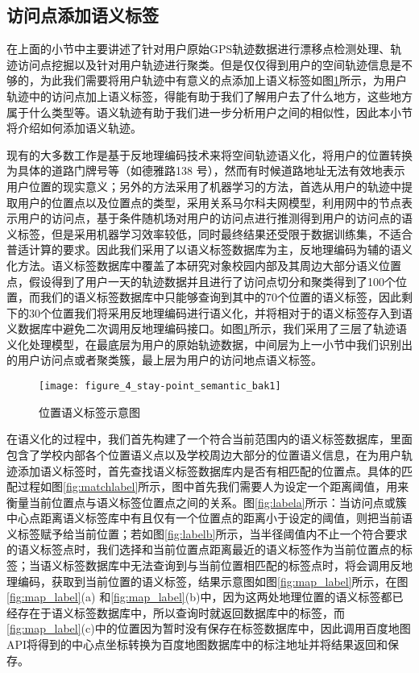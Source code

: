 \subsection{访问点添加语义标签}
\label{sec:section3-3}
\par 在上面的小节中主要讲述了针对用户原始GPS轨迹数据进行漂移点检测处理、轨迹访问点挖掘以及针对用户轨迹进行聚类。但是仅仅得到用户的空间轨迹信息是不够的，为此我们需要将用户轨迹中有意义的点添加上语义标签如图\ref{fig:tra_senantic}所示，为用户轨迹中的访问点加上语义标签，得能有助于我们了解用户去了什么地方，这些地方属于什么类型等。语义轨迹有助于我们进一步分析用户之间的相似性，因此本小节将介绍如何添加语义轨迹。
\par 现有的大多数工作是基于反地理编码技术来将空间轨迹语义化，将用户的位置转换为具体的道路门牌号等（如德雅路138 号），然而有时候道路地址无法有效地表示用户位置的现实意义；另外的方法采用了机器学习的方法，首选从用户的轨迹中提取用户的位置点以及位置点的类型，采用关系马尔科夫网模型，利用网中的节点表示用户的访问点，基于条件随机场对用户的访问点进行推测得到用户的访问点的语义标签，但是采用机器学习效率较低，同时最终结果还受限于数据训练集，不适合普适计算的要求。因此我们采用了以语义标签数据库为主，反地理编码为辅的语义化方法。语义标签数据库中覆盖了本研究对象校园内部及其周边大部分语义位置点，假设得到了用户一天的轨迹数据并且进行了访问点切分和聚类得到了100个位置，而我们的语义标签数据库中只能够查询到其中的70个位置的语义标签，因此剩下的30个位置我们将采用反地理编码进行语义化，并将相对于的语义标签存入到语义数据库中避免二次调用反地理编码接口。如图\ref{fig:tra_senantic}所示，我们采用了三层了轨迹语义化处理模型，在最底层为用户的原始轨迹数据，中间层为上一小节中我们识别出的用户访问点或者聚类簇，最上层为用户的访问地点语义标签。
\begin{figure}[htp]
\centering
\texttt{[image: figure\_4\_stay-point\_semantic\_bak1]}
\caption{位置语义标签示意图}
\label{fig:tra_senantic}
\end{figure}
\par 在语义化的过程中，我们首先构建了一个符合当前范围内的语义标签数据库，里面包含了学校内部各个位置语义点以及学校周边大部分的位置语义信息，在为用户轨迹添加语义标签时，首先查找语义标签数据库内是否有相匹配的位置点。具体的匹配过程如图\ref{fig:matchlabel}所示，图中首先我们需要人为设定一个距离阈值，用来衡量当前位置点与语义标签位置点之间的关系。图\ref{fig:labela}所示：当访问点或簇中心点距离语义标签库中有且仅有一个位置点的距离小于设定的阈值，则把当前语义标签赋予给当前位置；若如图\ref{fig:labelb}所示，当半径阈值内不止一个符合要求的语义标签点时，我们选择和当前位置点距离最近的语义标签作为当前位置点的标签；当语义标签数据库中无法查询到与当前位置相匹配的标签点时，将会调用反地理编码，获取到当前位置的语义标签，结果示意图如图\ref{fig:map_label}所示，在图\ref{fig:map_label}(a) 和\ref{fig:map_label}(b)中，因为这两处地理位置的语义标签都已经存在于语义标签数据库中，所以查询时就返回数据库中的标签，而\ref{fig:map_label}(c)中的位置因为暂时没有保存在标签数据库中，因此调用百度地图API将得到的中心点坐标转换为百度地图数据库中的标注地址并将结果返回和保存。

